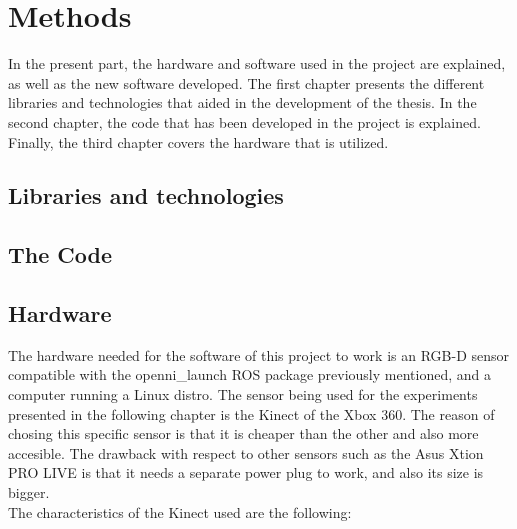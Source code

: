 \part*{Methods}
In the present part, the hardware and software used in the project are explained, as well as the new software developed. 
The first chapter presents the different libraries and technologies that aided in the development of the thesis. 
In the second chapter, the code that has been developed in the project is explained.
Finally, the third chapter covers the hardware that is utilized.


\chapter{Libraries and technologies}



\chapter{The Code}
  

\chapter{Hardware}
The hardware needed for the software of this project to work is an RGB-D sensor compatible with the openni\_launch ROS package previously mentioned, and a computer running a Linux distro. 
The sensor being used for the experiments presented in the following chapter is the Kinect of the Xbox 360. The reason of chosing this specific sensor is that it is cheaper than the other
and also more accesible. The drawback with respect to other sensors such as the Asus Xtion PRO LIVE\cite{xtion} is that it needs a separate power plug to work, and also its size is bigger. 
\\

The characteristics of the Kinect used are the following: 



